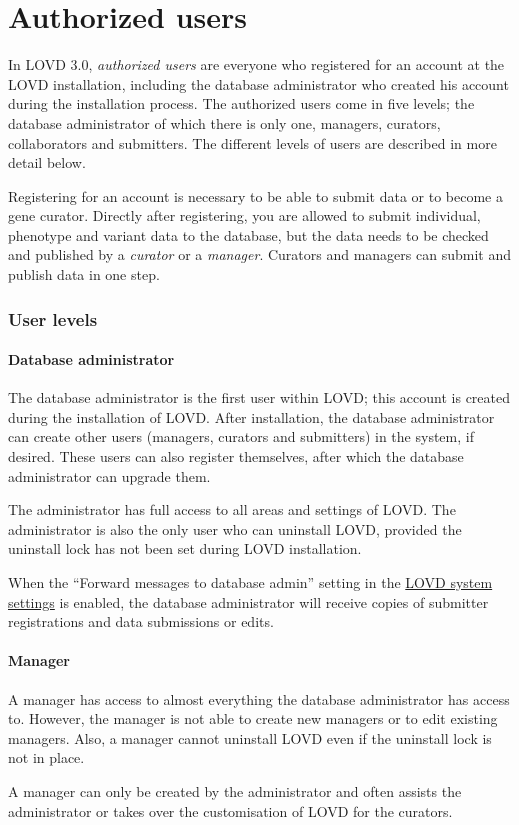 \documentclass[a4paper,oneside,openany,12pt]{memoir}
\begin{document}
\chapter{Authorized users}
In LOVD 3.0, \emph{authorized users} are everyone who registered for an account at the LOVD installation,
 including the database administrator who created his account during the installation process.
The authorized users come in five levels; the database administrator of which there is only one, managers, curators, collaborators and submitters.
The different levels of users are described in more detail below.
\par
Registering for an account is necessary to be able to submit data or to become a gene curator.
Directly after registering, you are allowed to submit individual, phenotype and variant data to the database,
 but the data needs to be checked and published by a \emph{curator} or a \emph{manager}.
Curators and managers can submit and publish data in one step.



\hypertarget{ss_user_levels}{}
\subsection{User levels}
\subsubsection{Database administrator}
The database administrator is the first user within LOVD; this account is created during the installation of LOVD.
After installation, the database administrator can create other users (managers, curators and submitters) in the system, if desired.
These users can also register themselves, after which the database administrator can upgrade them.
\par
The administrator has full access to all areas and settings of LOVD.
The administrator is also the only user who can uninstall LOVD, provided the uninstall lock has not been set during LOVD installation.
\\
\par
When the ``Forward messages to database admin'' setting in the \hyperlink{s_system_settings}{LOVD system settings} is enabled,
 the database administrator will receive copies of submitter registrations and data submissions or edits.

\subsubsection{Manager}
A manager has access to almost everything the database administrator has access to.
However, the manager is not able to create new managers or to edit existing managers.
Also, a manager cannot uninstall LOVD even if the uninstall lock is not in place.
\\
\par
A manager can only be created by the administrator and often assists the administrator or takes over the customisation of LOVD for the curators.
\end{document}
